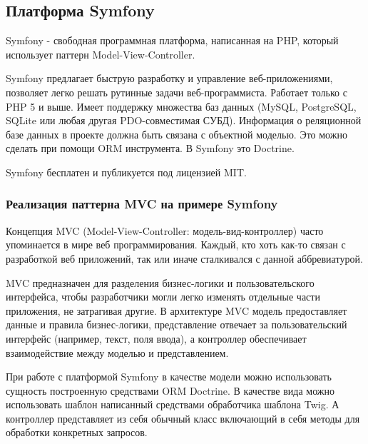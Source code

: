 \subsection{Платформа Symfony}
\label{sub:practice:symfony}

Symfony - свободная программная платформа, написанная на PHP, который использует паттерн Model-View-Controller.

Symfony предлагает быструю разработку и управление веб-приложениями, позволяет легко решать рутинные задачи веб-программиста. Работает только с PHP 5 и выше. Имеет поддержку множества баз данных (MySQL, PostgreSQL, SQLite или любая другая PDO-совместимая СУБД). Информация о реляционной базе данных в проекте должна быть связана с объектной моделью. Это можно сделать при помощи ORM инструмента. В Symfony это Doctrine.

Symfony бесплатен и публикуется под лицензией MIT.

\subsubsection{Реализация паттерна MVC на примере Symfony }

Концепция MVC (Model-View-Controller: модель-вид-контроллер) часто упоминается в мире веб программирования. Каждый, кто хоть как-то связан с разработкой веб приложений, так или иначе сталкивался с данной аббревиатурой. 

MVC предназначен для разделения бизнес-логики и пользовательского интерфейса, чтобы разработчики могли легко изменять отдельные части приложения, не затрагивая другие. В архитектуре MVC модель предоставляет данные и правила бизнес-логики, представление отвечает за пользовательский интерфейс (например, текст, поля ввода), а контроллер обеспечивает взаимодействие между моделью и представлением.

При работе с платформой Symfony в качестве модели можно использовать сущность построенную средствами ORM Doctrine. В качестве вида можно использовать шаблон написанный средствами обработчика шаблона Twig. А контроллер представляет из себя обычный класс включающий в себя методы для обработки конкретных запросов.

